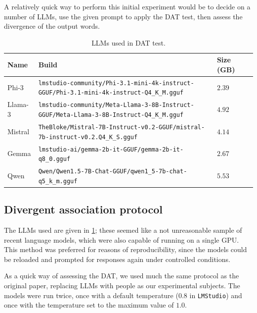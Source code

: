 \documentclass[9pt,a4paper,twoside]{rho-class/rho}
\begin{document}
A relatively quick way to perform this initial experiment would be to decide on a number of LLMs, use the given prompt to apply the DAT test, then assess the divergence of the output words.  

\begin{table}[pb]
            \RaggedRight
            \caption{LLMs used in DAT test.}
            \label{llmtable}
                \begin{tabular}{lllp{12.2cm}}
                    \toprule
                    \textbf{Name} & \textbf{Build} & \textbf{Size (GB) }  \\ 
                    \midrule
                    Phi-3 & \texttt{lmstudio-community/Phi-3.1-mini-4k-instruct-GGUF/Phi-3.1-mini-4k-instruct-Q4\_K\_M.gguf} & $2.39$ \\
                    Llama-3 & \texttt{lmstudio-community/Meta-Llama-3-8B-Instruct-GGUF/Meta-Llama-3-8B-Instruct-Q4\_K\_M.gguf} & $4.92$ \\
                    Mistral & \texttt{TheBloke/Mistral-7B-Instruct-v0.2-GGUF/mistral-7b-instruct-v0.2.Q4\_K\_S.gguf} & $4.14$ \\
                    Gemma & \texttt{lmstudio-ai/gemma-2b-it-GGUF/gemma-2b-it-q8\_0.gguf} & $2.67$ \\
                    Qwen & \texttt{Qwen/Qwen1.5-7B-Chat-GGUF/qwen1\_5-7b-chat-q5\_k\_m.gguf} & $5.53$ \\
                    \bottomrule
                \end{tabular}
        \end{table}

\subsection{Divergent association protocol}

The LLMs used are given in \ref{llmtable}; these seemed like a not unreasonable sample of recent language models, which were also capable of running on a single GPU. This method was preferred for reasons of reproducibility, since the models could be reloaded and prompted for responses again under controlled conditions. 

As a quick way of assessing the DAT, we used much the same protocol as the original paper, replacing LLMs with people as our experimental subjects. The models were run twice, once with a default temperature ($0.8$ in \texttt{LMStudio}) and once with the temperature set to the maximum value of $1.0$.  
\end{document}
